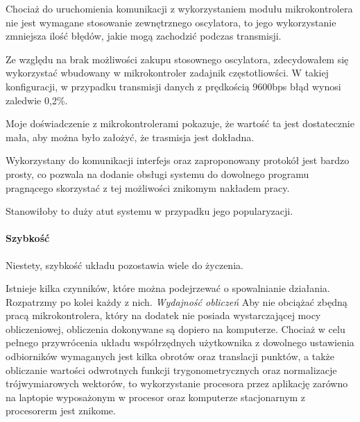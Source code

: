 Chociaż do uruchomienia komunikacji z wykorzystaniem modułu  mikrokontrolera nie jest wymagane stosowanie zewnętrznego oscylatora, to jego wykorzystanie zmniejsza ilość błędów, jakie mogą zachodzić podczas transmisji.

Ze względu na brak możliwości zakupu stosownego oscylatora, zdecydowałem się wykorzystać wbudowany w mikrokontroler zadajnik częstotliowści. W takiej konfiguracji, w przypadku transmisji danych z prędkością 9600bps błąd wynosi zaledwie 0,2\%.\label{sec:usart_error}

Moje doświadczenie z mikrokontrolerami pokazuje, że wartość ta jest dostatecznie mała, aby można było założyć, że trasmisja jest dokładna.

Wykorzystany do komunikacji interfejs oraz zaproponowany protokół jest bardzo prosty, co pozwala na dodanie obsługi systemu do dowolnego programu pragnącego skorzystać z tej możliwości znikomym nakładem pracy.

Stanowiłoby to duży atut systemu w przypadku jego popularyzacji.

\paragraph{Szybkość}
Niestety, szybkość układu pozostawia wiele do życzenia.

Istnieje kilka czynników, które można podejrzewać o spowalnianie działania. Rozpatrzmy po kolei każdy z nich.
\newline
\newline
\textsl{Wydajność obliczeń}
Aby nie obciążać zbędną pracą mikrokontrolera, który na dodatek nie posiada wystarczającej mocy obliczeniowej, obliczenia dokonywane są dopiero na komputerze. Chociaż w celu pełnego przywrócenia układu współrzędnych użytkownika z dowolnego ustawienia odbiorników wymaganych jest kilka obrotów oraz translacji punktów, a także obliczanie wartości odwrotnych funkcji trygonometrycznych oraz normalizacje trójwymiarowych wektorów, to wykorzystanie procesora przez aplikację zarówno na laptopie wyposażonym w procesor  oraz komputerze stacjonarnym z procesorerm  jest znikome.

